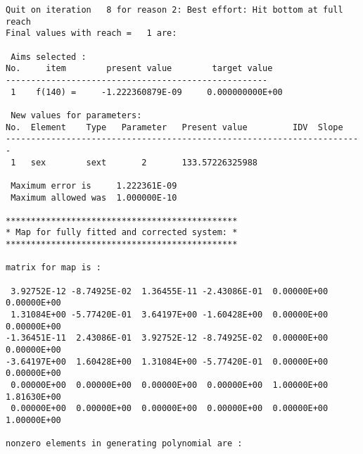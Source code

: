 \begin{footnotesize}
\begin{verbatim}
Quit on iteration   8 for reason 2: Best effort: Hit bottom at full reach
Final values with reach =   1 are:

 Aims selected :
No.     item        present value        target value
----------------------------------------------------
 1    f(140) =     -1.222360879E-09     0.000000000E+00

 New values for parameters:
No.  Element    Type   Parameter   Present value         IDV  Slope
-----------------------------------------------------------------------
 1   sex        sext       2       133.57226325988

 Maximum error is     1.222361E-09
 Maximum allowed was  1.000000E-10

**********************************************
* Map for fully fitted and corrected system: *
**********************************************

matrix for map is :

 3.92752E-12 -8.74925E-02  1.36455E-11 -2.43086E-01  0.00000E+00  0.00000E+00
 1.31084E+00 -5.77420E-01  3.64197E+00 -1.60428E+00  0.00000E+00  0.00000E+00
-1.36451E-11  2.43086E-01  3.92752E-12 -8.74925E-02  0.00000E+00  0.00000E+00
-3.64197E+00  1.60428E+00  1.31084E+00 -5.77420E-01  0.00000E+00  0.00000E+00
 0.00000E+00  0.00000E+00  0.00000E+00  0.00000E+00  1.00000E+00  1.81630E+00
 0.00000E+00  0.00000E+00  0.00000E+00  0.00000E+00  0.00000E+00  1.00000E+00

nonzero elements in generating polynomial are :


\end{verbatim}
\end{footnotesize}
